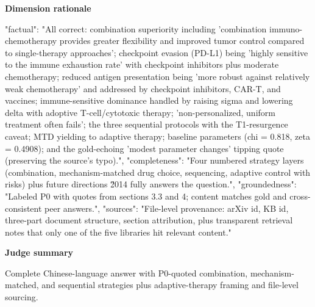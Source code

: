 \documentclass[10pt]{article}
\begin{document}
\textbf{Dimension rationale}
\begin{EvidenceText}
{
  "factual": "All correct: combination superiority including 'combination immuno-chemotherapy provides greater flexibility and improved tumor control compared to single-therapy approaches'; checkpoint evasion (PD-L1) being 'highly sensitive to the immune exhaustion rate' with checkpoint inhibitors plus moderate chemotherapy; reduced antigen presentation being 'more robust against relatively weak chemotherapy' and addressed by checkpoint inhibitors, CAR-T, and vaccines; immune-sensitive dominance handled by raising sigma and lowering delta with adoptive T-cell/cytotoxic therapy; 'non-personalized, uniform treatment often fails'; the three sequential protocols with the T1-resurgence caveat; MTD yielding to adaptive therapy; baseline parameters (chi = 0.818, zeta = 0.4908); and the gold-echoing 'modest parameter changes' tipping quote (preserving the source's typo).",
  "completeness": "Four numbered strategy layers (combination, mechanism-matched drug choice, sequencing, adaptive control with risks) plus future directions \u2014 fully answers the question.",
  "groundedness": "Labeled P0 with quotes from sections 3.3 and 4; content matches gold and cross-consistent peer answers.",
  "sources": "File-level provenance: arXiv id, KB id, three-part document structure, section attribution, plus transparent retrieval notes that only one of the five libraries hit relevant content."
}
\end{EvidenceText}

\textbf{Judge summary}
\begin{EvidenceText}
Complete Chinese-language answer with P0-quoted combination, mechanism-matched, and sequential strategies plus adaptive-therapy framing and file-level sourcing.
\end{EvidenceText}
\end{document}
